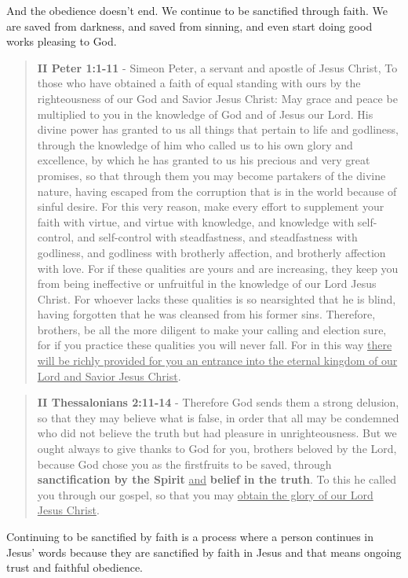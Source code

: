 \documentclass[11pt]{article}
\begin{document}
And the obedience doesn't end. We continue to be sanctified through faith. We are saved from darkness, and saved from sinning, and even start doing good works pleasing to God.

\begin{quote}
\textbf{II Peter 1:1-11} - Simeon Peter, a servant and apostle of Jesus Christ, To those who have obtained a faith of equal standing with ours by the righteousness of our God and Savior Jesus Christ: May grace and peace be multiplied to you in the knowledge of God and of Jesus our Lord.  His divine power has granted to us all things that pertain to life and godliness, through the knowledge of him who called us to his own glory and excellence, by which he has granted to us his precious and very great promises, so that through them you may become partakers of the divine nature, having escaped from the corruption that is in the world because of sinful desire.  For this very reason, make every effort to supplement your faith with virtue, and virtue with knowledge, and knowledge with self-control, and self-control with steadfastness, and steadfastness with godliness, and godliness with brotherly affection, and brotherly affection with love.  For if these qualities are yours and are increasing, they keep you from being ineffective or unfruitful in the knowledge of our Lord Jesus Christ.  For whoever lacks these qualities is so nearsighted that he is blind, having forgotten that he was cleansed from his former sins.  Therefore, brothers, be all the more diligent to make your calling and election sure, for if you practice these qualities you will never fall.  For in this way \uline{there will be richly provided for you an entrance into the eternal kingdom of our Lord and Savior Jesus Christ}.
\end{quote}

\begin{quote}
\textbf{II Thessalonians 2:11-14} - Therefore God sends them a strong delusion, so that they may believe what is false, in order that all may be condemned who did not believe the truth but had pleasure in unrighteousness. But we ought always to give thanks to God for you, brothers beloved by the Lord, because God chose you as the firstfruits to be saved, through \textbf{sanctification by the Spirit} \uline{and} \textbf{belief in the truth}. To this he called you through our gospel, so that you may \uline{obtain the glory of our Lord Jesus Christ}.
\end{quote}

Continuing to be sanctified by faith is a process where a person continues in Jesus' words because they are sanctified by faith in Jesus and that means ongoing trust and faithful obedience.
\end{document}
